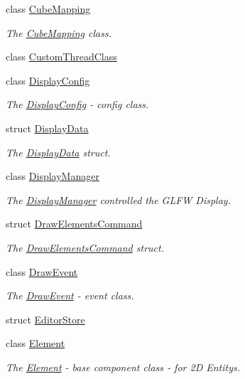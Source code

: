 \begin{DoxyCompactItemize}
class \hyperlink{classEngine_1_1CubeMapping}{Cube\+Mapping}
\begin{DoxyCompactList}\small\item\em The \hyperlink{classEngine_1_1CubeMapping}{Cube\+Mapping} class. \end{DoxyCompactList}\item 
class \hyperlink{classEngine_1_1CustomThreadClass}{Custom\+Thread\+Class}
\item 
class \hyperlink{classEngine_1_1DisplayConfig}{Display\+Config}
\begin{DoxyCompactList}\small\item\em The \hyperlink{classEngine_1_1DisplayConfig}{Display\+Config} -\/ config class. \end{DoxyCompactList}\item 
struct \hyperlink{structEngine_1_1DisplayData}{Display\+Data}
\begin{DoxyCompactList}\small\item\em The \hyperlink{structEngine_1_1DisplayData}{Display\+Data} struct. \end{DoxyCompactList}\item 
class \hyperlink{classEngine_1_1DisplayManager}{Display\+Manager}
\begin{DoxyCompactList}\small\item\em The \hyperlink{classEngine_1_1DisplayManager}{Display\+Manager} controlled the G\+L\+F\+W Display. \end{DoxyCompactList}\item 
struct \hyperlink{structEngine_1_1DrawElementsCommand}{Draw\+Elements\+Command}
\begin{DoxyCompactList}\small\item\em The \hyperlink{structEngine_1_1DrawElementsCommand}{Draw\+Elements\+Command} struct. \end{DoxyCompactList}\item 
class \hyperlink{classEngine_1_1DrawEvent}{Draw\+Event}
\begin{DoxyCompactList}\small\item\em The \hyperlink{classEngine_1_1DrawEvent}{Draw\+Event} -\/ event class. \end{DoxyCompactList}\item 
struct \hyperlink{structEngine_1_1EditorStore}{Editor\+Store}
\item 
class \hyperlink{classEngine_1_1Element}{Element}
\begin{DoxyCompactList}\small\item\em The \hyperlink{classEngine_1_1Element}{Element} -\/ base component class -\/ for 2\+D Entitys. \end{DoxyCompactList}\item 

\end{DoxyCompactItemize}
